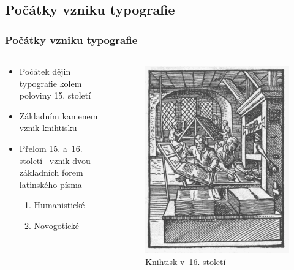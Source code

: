 \documentclass{beamer}
\begin{document}
\subsection{Počátky vzniku typografie}
\begin{frame}\frametitle{Počátky vzniku typografie}
\begin{columns}
\begin{column}{7cm}
\begin{itemize}
\item	Počátek dějin typografie kolem poloviny 15. století \pause
\item	Základním kamenem vznik knihtisku \pause
\item	Přelom 15. a~16. století\,--\,vznik dvou základních forem latinského písma \pause
\begin{enumerate}
\item{Humanistické} \pause
\item{Novogotické}
\end{enumerate}
\end{itemize}
\end{column}
\begin{column}{6cm}
\begin{figure}
\includegraphics[scale=0.18]{knihtisk.eps} 
\caption{Knihtisk v~16. století}
\end{figure}
\end{column}
\end{columns}
\end{frame}
\end{document}
